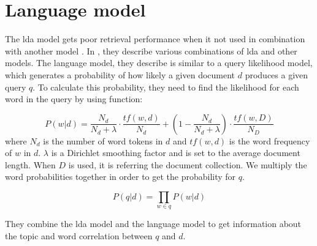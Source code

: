\section{Language model}
The \gls{lda} model gets poor retrieval performance when it not used in combination with another model \cite{yang2009topic}.
In \cite{yang2009topic}, they describe various combinations of \gls{lda} and other models. 
The language model, they describe is similar to a query likelihood model, which generates a probability of how likely a given document $d$ produces a given query $q$.
To calculate this probability, they need to find the likelihood for each word in the query by using function:

$$ P(w|d) = \frac{N_d}{N_d + \lambda} \cdot \frac{tf(w,d)}{N_d} + (1 - \frac{N_d}{N_d + \lambda}) \cdot \frac{tf(w,D)}{N_D} $$
where $N_d$ is the number of word tokens in $d$ and $tf(w,d)$ is the word frequency of $w$ in $d$. $\lambda$ is a Dirichlet smoothing factor and is set to the average document length.
When $D$ is used, it is referring the document collection.
We multiply the word probabilities together in order to get the probability for $q$.

$$ P(q|d) = \prod_{w \in q} P(w|d) $$
 
They combine the \gls{lda} model and the language model to get information about the topic and word correlation between $q$ and $d$.
